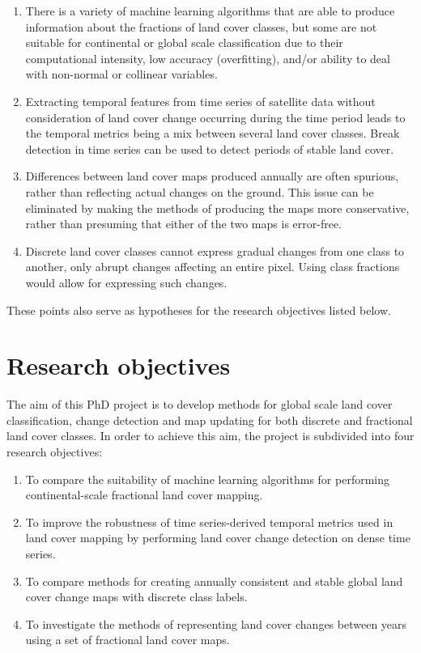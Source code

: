 \documentclass[10pt]{article}
\begin{document}
\begin{mdframed}[style=table,frametitle=\textbf{7. DETAILED DESCRIPTION OF THE RESEARCH PLAN} (max. 2500 words + 1 page literature list)]
\begin{enumerate}
 \item There is a variety of machine learning algorithms that are able to produce information about the fractions of land cover classes, but some are not suitable for continental or global scale classification due to their computational intensity, low accuracy (overfitting), and/or ability to deal with non-normal or collinear variables.
 \item Extracting temporal features from time series of satellite data without consideration of land cover change occurring during the time period leads to the temporal metrics being a mix between several land cover classes. Break detection in time series can be used to detect periods of stable land cover.
 \item Differences between land cover maps produced annually are often spurious, rather than reflecting actual changes on the ground. This issue can be eliminated by making the methods of producing the maps more conservative, rather than presuming that either of the two maps is error-free.
 \item Discrete land cover classes cannot express gradual changes from one class to another, only abrupt changes affecting an entire pixel. Using class fractions would allow for expressing such changes.
\end{enumerate}

These points also serve as hypotheses for the research objectives listed below.

\section{Research objectives}

The aim of this PhD project is to develop methods for global scale land cover classification, change detection and map updating for both discrete and fractional land cover classes. In order to achieve this aim, the project is subdivided into four research objectives:

\begin{enumerate}[label=RO\arabic*]
 \item \label{RO1} To compare the suitability of machine learning algorithms for performing continental-scale fractional land cover mapping.
 \item \label{RO2} To improve the robustness of time series-derived temporal metrics used in land cover mapping by performing land cover change detection on dense time series.
 \item \label{RO3} To compare methods for creating annually consistent and stable global land cover change maps with discrete class labels. %
 \item \label{RO4} To investigate the methods of representing land cover changes between years using a set of fractional land cover maps.
\end{enumerate}


\end{mdframed}
\end{document}
